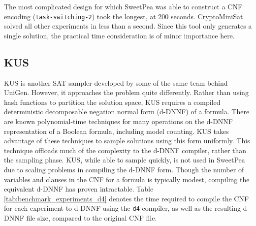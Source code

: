 The most complicated design for which SweetPea was able to construct a CNF encoding (\texttt{task-switching-2}) took the longest, at 200 seconds. CryptoMiniSat solved all other experiments in less than a second. Since this tool only generates a single solution, the practical time consideration is of minor importance here.


\subsection{KUS}

KUS \cite{SGRM18} is another SAT sampler developed by some of the same team behind UniGen. However, it approaches the problem quite differently. Rather than using hash functions to partition the solution space, KUS requires a compiled deterministic decomposable negation normal form (d-DNNF) of a formula. There are known polynomial-time techniques for many operations on the d-DNNF representation of a Boolean formula, including model counting. KUS takes advantage of these techniques to sample solutions using this form uniformly. This technique offloads much of the complexity to the d-DNNF compiler, rather than the sampling phase. KUS, while able to sample quickly, is not used in SweetPea due to scaling problems in compiling the d-DNNF form. Though the number of variables and clauses in the CNF for a formula is typically modest, compiling the equivalent d-DNNF has proven intractable. Table \ref{tab:benchmark_experiments_d4} denotes the time required to compile the CNF for each experiment to d-DNNF using the \texttt{d4} compiler, as well as the resulting d-DNNF file size,  compared to the original CNF file.




